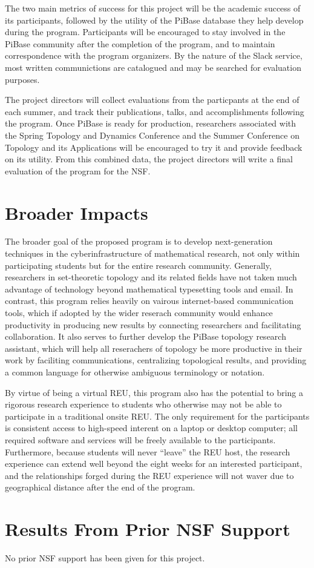   The two main metrics of success for this project will be the academic success
  of its participants, followed by the utility of the PiBase database they help
  develop during the program. Participants will be encouraged to stay involved
  in the PiBase community after the completion of the program, and to maintain
  correspondence with the program organizers. By the nature of the Slack
  service, most written communictions are catalogued and may be searched for
  evaluation purposes.

  The project directors will collect evaluations from the particpants at the end
  of each summer, and track their publications, talks, and
  accomplishments following the program. Once PiBase is ready for production,
  researchers associated with the Spring Topology and Dynamics Conference
  and the Summer Conference on Topology and its Applications
  will be encouraged to try it and provide feedback on its utility. From this
  combined data, the project directors will write a final evaluation of the
  program for the NSF.

\section{Broader Impacts}

  The broader goal of the proposed program is to develop next-generation
  techniques in the cyberinfrastructure of mathematical research,
  not only within participating students but for the entire research
  community. Generally, researchers in set-theoretic topology
  and its related fields have not
  taken much advantage of technology beyond mathematical typesetting tools
  and email. In contrast, this program relies heavily on vairous internet-based
  communication tools, which if adopted by the wider
  reserach community would enhance productivity in producing new results
  by connecting researchers and facilitating collaboration. It also serves to
  further develop the PiBase topology research assistant, which will help all
  reserachers of topology be more productive in their work by faciliting
  communications, centralizing topological results, and providing a common
  language for otherwise ambiguous terminology or notation.

  By virtue of being a virtual REU, this program also has the potential to
  bring a rigorous research experience to students who otherwise may not
  be able to participate in a traditional onsite REU. The only requirement
  for the participants is consistent access to high-speed interent on a
  laptop or desktop computer; all required software and services will
  be freely available to the participants. Furthermore, because students
  will never ``leave'' the REU host, the research experience can extend
  well beyond the eight weeks for an interested participant, and the
  relationships forged during the REU experience will not waver due to
  geographical distance after the end of the program.

\section{Results From Prior NSF Support}

  No prior NSF support has been given for this project.
